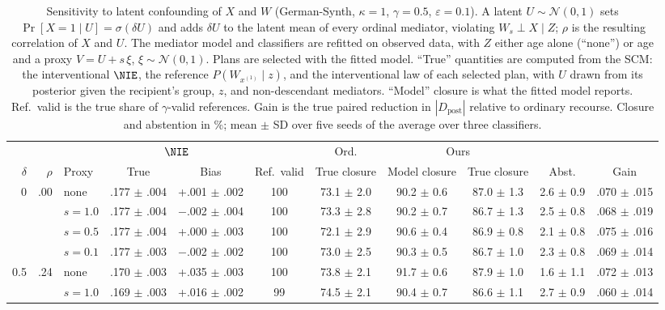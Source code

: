\begin{table}[t]
\centering
\footnotesize
\caption{Sensitivity to latent confounding of $X$ and $W$ (German-Synth,
$\kappa=1$, $\gamma=0.5$, $\varepsilon=0.1$). A latent $U\sim\mathcal N(0,1)$
sets $\Pr[X=1\mid U]=\sigma(\delta U)$ and adds $\delta U$ to the latent mean
of every ordinal mediator, violating $W_s\perp X\mid Z$;
$\rho$ is the resulting correlation of $X$ and $U$. The mediator model and
classifiers are refitted on observed data, with $Z$ either age alone
(``none'') or age and a proxy $V=U+s\,\xi$, $\xi\sim\mathcal N(0,1)$. Plans
are selected with the fitted model. ``True'' quantities are computed from the
SCM: the interventional $\NIE$, the reference $P(W_{x^{(1)}}\mid z)$, and the
interventional law of each selected plan, with $U$ drawn from its posterior
given the recipient's group, $z$, and non-descendant mediators. ``Model''
closure is what the fitted model reports. Ref.\ valid is the true share of
$\gamma$-valid references. Gain is the true paired reduction in
$|D_{\mathrm{post}}|$ relative to ordinary recourse. Closure and abstention in
\%; mean $\pm$ SD over five seeds of the average over three classifiers.}
\label{tab:app_confounding}
\setlength{\tabcolsep}{3pt}
\begin{tabular}{rrl cc c c cc c c}
\hline
& & & \multicolumn{2}{c}{$\NIE$} & & Ord. & \multicolumn{2}{c}{Ours} & & \\
$\delta$ & $\rho$ & Proxy & True & Bias & Ref.\ valid & True closure &
Model closure & True closure & Abst. & Gain \\
\hline
0 & .00 & none & .177 $\pm$ .004 & +.001 $\pm$ .002 & 100 & 73.1 $\pm$ 2.0 & 90.2 $\pm$ 0.6 & 87.0 $\pm$ 1.3 & 2.6 $\pm$ 0.9 & .070 $\pm$ .015 \\
 &  & $s=1.0$ & .177 $\pm$ .004 & $-$.002 $\pm$ .004 & 100 & 73.3 $\pm$ 2.8 & 90.2 $\pm$ 0.7 & 86.7 $\pm$ 1.3 & 2.5 $\pm$ 0.8 & .068 $\pm$ .019 \\
 &  & $s=0.5$ & .177 $\pm$ .004 & +.000 $\pm$ .003 & 100 & 72.1 $\pm$ 2.9 & 90.6 $\pm$ 0.4 & 86.9 $\pm$ 0.8 & 2.1 $\pm$ 0.8 & .075 $\pm$ .016 \\
 &  & $s=0.1$ & .177 $\pm$ .003 & $-$.002 $\pm$ .002 & 100 & 73.0 $\pm$ 2.5 & 90.3 $\pm$ 0.5 & 86.7 $\pm$ 1.0 & 2.3 $\pm$ 0.8 & .069 $\pm$ .014 \\
\hline
0.5 & .24 & none & .170 $\pm$ .003 & +.035 $\pm$ .003 & 100 & 73.8 $\pm$ 2.1 & 91.7 $\pm$ 0.6 & 87.9 $\pm$ 1.0 & 1.6 $\pm$ 1.1 & .072 $\pm$ .013 \\
 &  & $s=1.0$ & .169 $\pm$ .003 & +.016 $\pm$ .002 & 99 & 74.5 $\pm$ 2.1 & 90.4 $\pm$ 0.7 & 86.6 $\pm$ 1.1 & 2.7 $\pm$ 0.9 & .060 $\pm$ .014 \\

\end{tabular}
\end{table}
